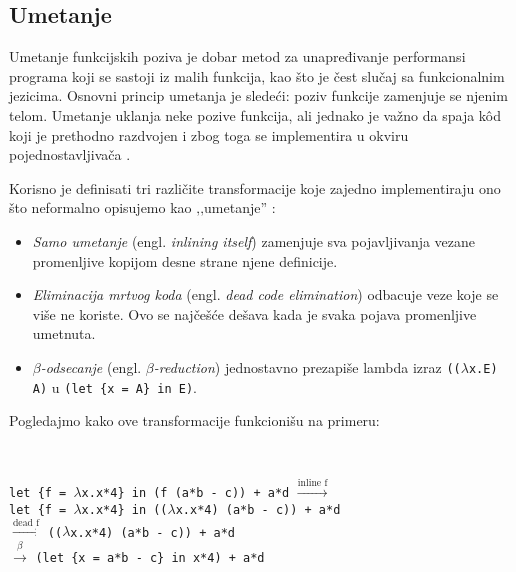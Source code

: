\subsection{Umetanje}

Umetanje funkcijskih poziva je dobar metod za unapređivanje performansi programa koji se sastoji iz malih funkcija, kao što je čest slučaj sa funkcionalnim jezicima. Osnovni princip umetanja je sledeći: poziv funkcije zamenjuje se njenim telom. Umetanje uklanja neke pozive funkcija, ali jednako je važno da spaja k\^ od koji je prethodno razdvojen i zbog toga se implementira u okviru pojednostavljivača \cite{compilation-by-program-transformation}.

Korisno je definisati tri različite transformacije koje zajedno implementiraju ono što neformalno opisujemo kao ‚‚umetanje'' \cite{secrets-haskell-compiler-inliner, compilation-by-program-transformation}:
\begin{itemize}
	\item \textit{Samo umetanje} (engl. \textit{inlining itself}) zamenjuje sva pojavljivanja vezane promenljive kopijom desne strane njene definicije.
	
	
	\item \textit{Eliminacija mrtvog koda} (engl. \textit{dead code elimination}) odbacuje veze koje se više ne koriste. Ovo se najčešće dešava kada je svaka pojava promenljive umetnuta.
	
	\item \textit{$\beta$-odsecanje} (engl. \textit{$\beta$-reduction}) jednostavno prezapiše lambda izraz \verb|((|$\lambda$\verb|x.E) A)| u \verb|(let {x = A} in E)|. 
\end{itemize}

\noindent Pogledajmo kako ove transformacije funkcionišu na primeru:

\begin{primer} ~
	\begin{center}
		\verb|let {f = |$\lambda$\verb|x.x*4} in (f (a*b - c)) + a*d| 	$\stackrel{\text{inline f}}{\longrightarrow}$ \\
	\verb|let {f = |$\lambda$\verb|x.x*4} in ((|$\lambda$\verb|x.x*4) (a*b - c)) + a*d| \\
		$\stackrel{\text{dead f}}{\longrightarrow}$ \verb|((|$\lambda$\verb|x.x*4) (a*b - c)) + a*d|  \\
		$\stackrel{\beta}{\longrightarrow}$ \verb|(let {x = a*b - c} in x*4) + a*d|
	\end{center}
\end{primer}

